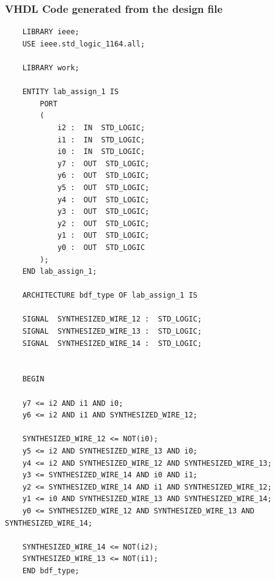 \documentclass[12pt]{article}
\begin{document}
\subsubsection{VHDL Code generated from the design file}
\begin{verbatim}
    LIBRARY ieee;
    USE ieee.std_logic_1164.all; 
    
    LIBRARY work;
    
    ENTITY lab_assign_1 IS 
    	PORT
    	(
    		i2 :  IN  STD_LOGIC;
    		i1 :  IN  STD_LOGIC;
    		i0 :  IN  STD_LOGIC;
    		y7 :  OUT  STD_LOGIC;
    		y6 :  OUT  STD_LOGIC;
    		y5 :  OUT  STD_LOGIC;
    		y4 :  OUT  STD_LOGIC;
    		y3 :  OUT  STD_LOGIC;
    		y2 :  OUT  STD_LOGIC;
    		y1 :  OUT  STD_LOGIC;
    		y0 :  OUT  STD_LOGIC
    	);
    END lab_assign_1;
    
    ARCHITECTURE bdf_type OF lab_assign_1 IS 
    
    SIGNAL	SYNTHESIZED_WIRE_12 :  STD_LOGIC;
    SIGNAL	SYNTHESIZED_WIRE_13 :  STD_LOGIC;
    SIGNAL	SYNTHESIZED_WIRE_14 :  STD_LOGIC;
    
    
    BEGIN 
    
    y7 <= i2 AND i1 AND i0;    
    y6 <= i2 AND i1 AND SYNTHESIZED_WIRE_12;

    SYNTHESIZED_WIRE_12 <= NOT(i0);
    y5 <= i2 AND SYNTHESIZED_WIRE_13 AND i0;
    y4 <= i2 AND SYNTHESIZED_WIRE_12 AND SYNTHESIZED_WIRE_13;
    y3 <= SYNTHESIZED_WIRE_14 AND i0 AND i1;
    y2 <= SYNTHESIZED_WIRE_14 AND i1 AND SYNTHESIZED_WIRE_12;
    y1 <= i0 AND SYNTHESIZED_WIRE_13 AND SYNTHESIZED_WIRE_14;
    y0 <= SYNTHESIZED_WIRE_12 AND SYNTHESIZED_WIRE_13 AND SYNTHESIZED_WIRE_14;
    
    SYNTHESIZED_WIRE_14 <= NOT(i2);
    SYNTHESIZED_WIRE_13 <= NOT(i1);
    END bdf_type;

\end{verbatim}
\end{document}
